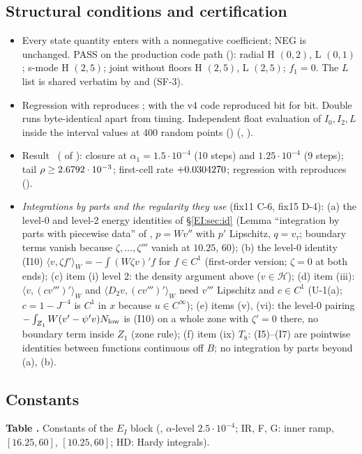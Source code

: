 \documentclass[11pt]{article}
\begin{document}
\subsection{Structural conditions and certification}\label{EI:sec:cert}
\begin{itemize}[leftmargin=*]
\item Every state quantity enters with a nonnegative coefficient; NEG is unchanged.  PASS on the production code path (): radial H $(0,2)$, L $(0,1)$; s-mode H $(2,5)$; joint without floors H $(2,5)$, L $(2,5)$; $f_1=0$. The $L$ list is shared verbatim by  and  (SF-3).
\item Regression with  reproduces ; with  the v4 code reproduced  bit for bit. Double runs byte-identical apart from timing. Independent float evaluation of $I_0,I_2,L$ inside the interval values at 400 random points () (, ).
\item Result \tC\ ( of ): closure at $\alpha_1=1.5\cdot10^{-4}$ (10 steps) and $1.25\cdot10^{-4}$ (9 steps); tail $\rho\ge2.6792\cdot10^{-3}$; first-cell rate $+0.0304270$; regression with  reproduces  ().
\item \emph{Integrations by parts and the regularity they use} (fix11 C-6, fix15 D-4): (a) the level-0 and level-2 energy identities of \S\ref{EI:sec:id} (Lemma ``integration by parts with piecewise data'' of , $p=Wv''$ with $p'$ Lipschitz, $q=v_\tau$; boundary terms vanish because $\zeta,\dots,\zeta'''$ vanish at $10.25$, $60$); (b) the level-0 identity (I10) $\langle v,\zeta f'\rangle_W=-\int(W\zeta v)'f$ for $f\in C^1$ (first-order version; $\zeta=0$ at both ends); (c) item (i) level 2: the density argument above ($v\in\mathcal H$); (d) item (iii): $\langle v,(cv''')'\rangle_W$ and $\langle D_2v,(cv''')'\rangle_W$ need $v'''$ Lipschitz and $c\in C^1$ (U-1(a); $c=1-J^{-4}$ is $C^1$ in $x$ because $u\in C^\infty$); (e) items (v), (vi): the level-0 pairing $-\int_{Z_1}W(v'-\psi'v)N_{\rm low}$ is (I10) on a whole zone with $\zeta'=0$ there, no boundary term inside $Z_1$ (zone rule); (f) item (ix) $T_8$: (I5)--(I7) are pointwise identities between functions continuous off $B$; no integration by parts beyond (a), (b).
\end{itemize}

\subsection{Constants}\label{EI:sec:const}
\begin{center}\small\textbf{Table \thetable\label{EI:tab:const}.} Constants of the $E_I$ block (, $\alpha$-level $2.5\cdot10^{-4}$; IR, F, G: inner ramp, $[16.25,60]$, $[10.25,60]$; HD: Hardy integrals).\end{center}

\end{document}
